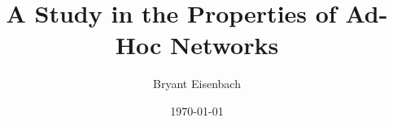 \def\uni{bje2113}
\def\class{ELEN E6950}

\author{Bryant Eisenbach}
\title{A Study in the Properties of Ad-Hoc Networks}
\date{\today}
